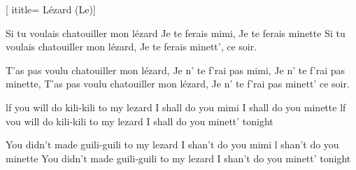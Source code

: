  [
ititle= {Lézard (Le)}]

\beginverse
Si tu voulais chatouiller mon lézard
Je te ferais mimi,
Je te ferais minette
Si tu voulais chatouiller mon lézard,
Je te ferais minett', ce soir.
\endverse

\beginverse
T'as pas voulu chatouiller mon lézard,
Je n' te f'rai pas mimi,
Je n' te f'rai pas minette,
T'as pas voulu chatouiller mon lézard,
Je n' te f'rai pas minett' ce soir.
\endverse

\beginverse
lf you will do kili-kili to my lezard
I shall do you mimi
I shall do you minette
lf vou will do kili-kili to my lezard
I shall do you minett' tonight
\endverse

\beginverse
You didn't made guili-guili to my lezard
I shan't do you mimi
l shan't do you minette
You didn't made guili-guili to my lezard
I shan't do you minett' tonight
\endverse

\endsong